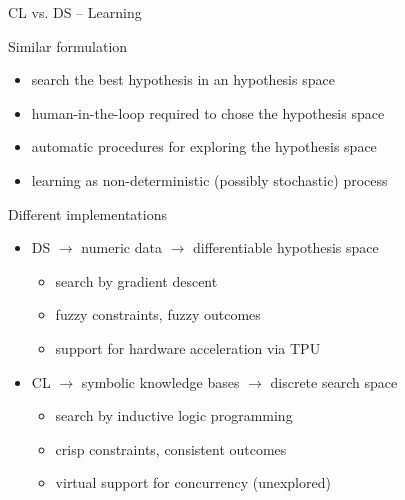\documentclass[presentation]{beamer}\mode<presentation>{\usetheme{AMSBolognaFC}}
\begin{document}
\begin{frame}[allowframebreaks]{CL vs. DS -- Learning}
    \begin{block}{Similar formulation}
        \begin{itemize}
            \item search the best hypothesis in an hypothesis space
            \item human-in-the-loop required to chose the hypothesis space
            \item automatic procedures for exploring the hypothesis space
            \item learning as non-deterministic (possibly stochastic) process
        \end{itemize}
    \end{block}

    \begin{block}{Different implementations}
        \begin{itemize}
            \item DS $\rightarrow$ numeric data $\rightarrow$ differentiable hypothesis space
            \begin{itemize}
                \item search by gradient descent
                \item fuzzy constraints, fuzzy outcomes
                \item support for hardware acceleration via TPU
            \end{itemize}

            \item CL $\rightarrow$ symbolic knowledge bases $\rightarrow$ discrete search space
            \begin{itemize}
                \item search by inductive logic programming
                \item crisp constraints, consistent outcomes
                \item virtual support for concurrency (unexplored)
            \end{itemize}
        \end{itemize}
    \end{block}


\end{frame}
\end{document}
